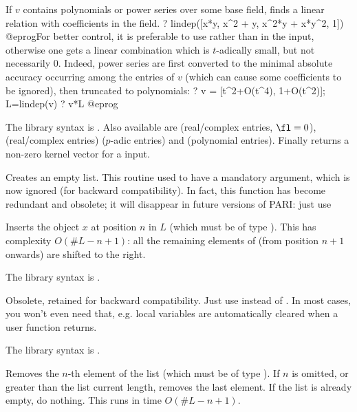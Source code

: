 If $v$ contains polynomials or power series over some base field, finds a
linear relation with coefficients in the field.
\bprog
? lindep([x*y, x^2 + y, x^2*y + x*y^2, 1])
@eprog\noindent For better control, it is preferable to use  rather
than  in the input, otherwise one gets a linear combination which is
$t$-adically small, but not necessarily $0$. Indeed, power series are first
converted to the minimal absolute accuracy occurring among the entries of $v$
(which can cause some coefficients to be ignored), then truncated to
polynomials:
\bprog
? v = [t^2+O(t^4), 1+O(t^2)]; L=lindep(v)
? v*L
@eprog

The library syntax is .
Also available are  (real/complex entries,
$\fl=0$),  (real/complex entries)
 ($p$-adic entries) and
 (polynomial entries).
Finally  returns a non-zero kernel vector for a
 input.

\label{se:listcreate}
Creates an empty list. This routine used to have a mandatory argument,
which is now ignored (for backward compatibility). In fact, this function
has become redundant and obsolete; it will disappear in future versions of
PARI: just use 

\label{se:listinsert}
Inserts the object $x$ at
position $n$ in $L$ (which must be of type ). This has
complexity $O(\#L - n + 1)$: all the
remaining elements of  (from position $n+1$ onwards) are shifted
to the right.

The library syntax is .

\label{se:listkill}
Obsolete, retained for backward compatibility. Just use 
instead of . In most cases, you won't even need that, e.g.
local variables are automatically cleared when a user function returns.

The library syntax is .

\label{se:listpop}
Removes the $n$-th element of the list
 (which must be of type ). If $n$ is omitted,
or greater than the list current length, removes the last element.
If the list is already empty, do nothing. This runs in time $O(\#L - n + 1)$.


